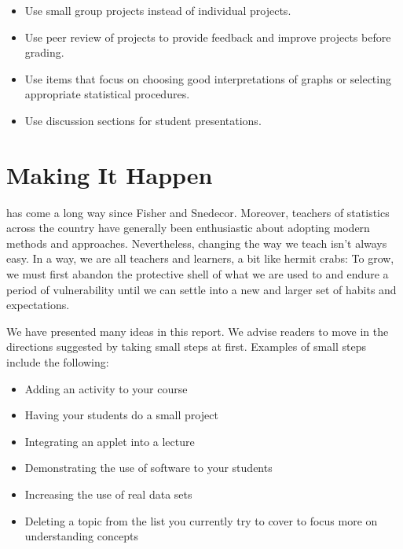  \vspace{.2in}
\noindent{}
\begin{itemize}[leftmargin=1cm, itemsep=.2em]
\item Use small group projects instead of individual projects.
\item Use peer review of projects to provide feedback and improve projects before grading.
\item Use items that focus on choosing good interpretations of graphs or selecting appropriate statistical procedures.
\item Use discussion sections for student presentations.
\end{itemize}


\section{\textbf{Making It Happen}}
 
 has come a long way since Fisher and Snedecor. Moreover, teachers of statistics across the country have generally been enthusiastic about adopting modern methods and approaches. Nevertheless, changing the way we teach isn't always easy. In a way, we are all teachers and learners, a bit like hermit crabs:  To grow, we must first abandon the protective shell of what we are used to and endure a period of vulnerability until we can settle into a new and larger set of habits and expectations. 
 
We have presented many ideas in this report.  We advise readers to move in the directions suggested by taking small steps at first.  Examples of small steps include the following:

\renewcommand{\labelitemi}{$\filledsquare$}

\begin{itemize} [leftmargin=1cm, itemsep=.2em]
\item Adding an activity to your course
\item Having your students do a small project
\item Integrating an applet into a lecture
\item Demonstrating the use of software to your students
\item Increasing the use of real data sets
\item Deleting a topic from the list you currently try to cover to focus more on understanding concepts
\end{itemize}

